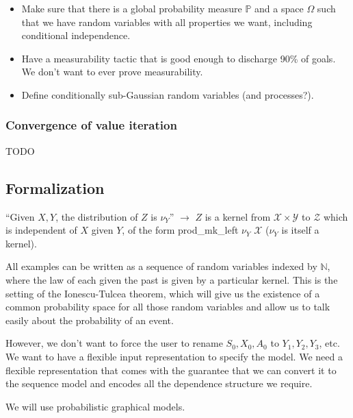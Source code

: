 \begin{remark}
\begin{itemize}
    \item Make sure that there is a global probability measure $\mathbb{P}$ and a space $\Omega$ such that we have random variables with all properties we want, including conditional independence.
    \item Have a measurability tactic that is good enough to discharge 90\% of goals. We don't want to ever prove measurability.
    \item Define conditionally sub-Gaussian random variables (and processes?).
\end{itemize}
\end{remark}

\subsubsection{Convergence of value iteration}
\label{ssub:convergence_of_value_iteration}

TODO

\subsection{Formalization}

``Given $X, Y$, the distribution of $Z$ is $\nu_Y$'' $\to$ $Z$ is a kernel from $\mathcal X \times \mathcal Y$ to $\mathcal Z$ which is independent of $X$ given $Y$, of the form prod_mk_left $\nu_Y$ $\mathcal X$ ($\nu_Y$ is itself a kernel).

All examples can be written as a sequence of random variables indexed by $\mathbb{N}$, where the law of each given the past is given by a particular kernel. This is the setting of the Ionescu-Tulcea theorem, which will give us the existence of a common probability space for all those random variables and allow us to talk easily about the probability of an event. 

However, we don't want to force the user to rename $S_0, X_0, A_0$ to $Y_1, Y_2, Y_3$, etc. We want to have a flexible input representation to specify the model. We need a flexible representation that comes with the guarantee that we can convert it to the sequence model and encodes all the dependence structure we require.

We will use probabilistic graphical models.


